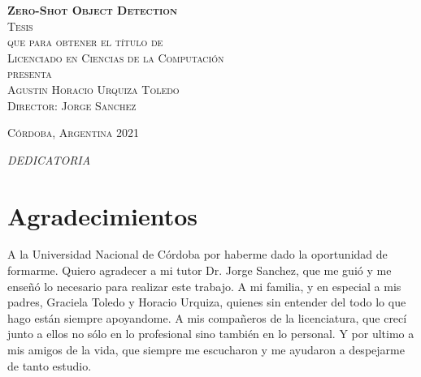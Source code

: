 \documentclass[12pt,twosided]{book}
\begin{document}
\begin{titlepage}
\begin{center}
\textsc{\huge \textbf{Zero-Shot Object Detection}}\\[2em]

\textsc{\large Tesis}\\[1em]

\textsc{que para obtener el título de}\\[1em]

\textsc{Licenciado en Ciencias de la Computación}\\[1em]

\textsc{presenta}\\[1em]

\textsc{\Large Agustin Horacio Urquiza Toledo}\\[1em]

\textsc{\large Director: Jorge Sanchez}

\end{center}

\vspace*{\fill}
\textsc{Córdoba, Argentina \hspace*{\fill} 2021}

\end{titlepage}

\pagestyle{empty}
\frontmatter

\begin{flushright}
\textit{DEDICATORIA}
\end{flushright}


\chapter*{Agradecimientos}
A la Universidad Nacional de Córdoba por haberme dado la
oportunidad de formarme. Quiero agradecer a mi tutor Dr. Jorge Sanchez, que me guió y me enseñó lo necesario para realizar este trabajo. A mi familia, y en especial a mis padres, Graciela Toledo y Horacio Urquiza, quienes sin entender del todo lo que hago están siempre apoyandome. A mis compañeros de la licenciatura, que crecí junto a ellos no sólo en lo profesional sino también en lo personal. Y por ultimo a mis amigos de la vida, que siempre me escucharon y me ayudaron a despejarme de tanto estudio.
\end{document}
